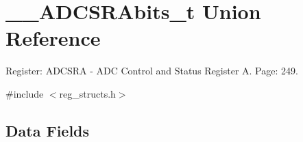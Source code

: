 \hypertarget{union_____a_d_c_s_r_abits__t}{\section{\+\_\+\+\_\+\+A\+D\+C\+S\+R\+Abits\+\_\+t Union Reference}
\label{union_____a_d_c_s_r_abits__t}
}


Register\+: A\+D\+C\+S\+R\+A -\/ A\+D\+C Control and Status Register A. Page\+: 249.  




{\ttfamily \#include $<$reg\+\_\+structs.\+h$>$}

\subsection*{Data Fields}
